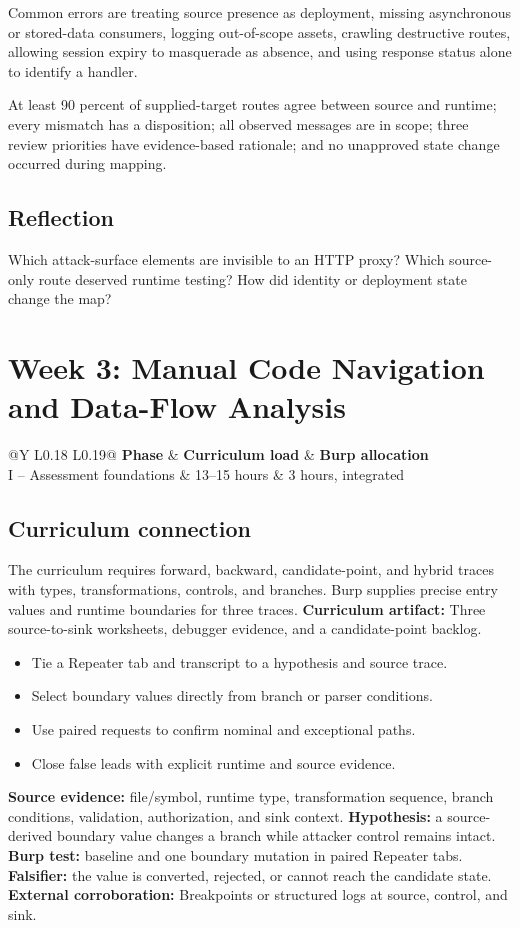 \documentclass[11pt]{article}
\makeatletter
\newcommand{\weekheader}[5]{%
  \clearpage
  \section{Week #1: #2}
  \begin{tcolorbox}[colback=Navy,colframe=Navy,coltext=white]
    \begin{tabularx}{\linewidth}{@{}Y L{0.18\linewidth} L{0.19\linewidth}@{}}
      \textbf{Phase} & \textbf{Curriculum load} & \textbf{Burp allocation}\\
      #3 & #4 hours & #5 hours, integrated
    \end{tabularx}
  \end{tcolorbox}
}
\newcommand{\weekfield}[2]{%
  \Needspace{5\baselineskip}
  \subsection*{#1}
  #2
}
\newcommand{\curriculumartifact}[1]{\textbf{Curriculum artifact:} #1}
\newcommand{\externalproof}[1]{\textbf{External corroboration:} #1}
\makeatother
\begin{document}
\begin{troubleshootingbox}
Common errors are treating source presence as deployment, missing asynchronous
or stored-data consumers, logging out-of-scope assets, crawling destructive
routes, allowing session expiry to masquerade as absence, and using response
status alone to identify a handler.
\end{troubleshootingbox}

\begin{checkpoints}
At least 90 percent of supplied-target routes agree between source and runtime;
every mismatch has a disposition; all observed messages are in scope; three
review priorities have evidence-based rationale; and no unapproved state change
occurred during mapping.
\end{checkpoints}

\weekfield{Reflection}{Which attack-surface elements are invisible to an HTTP
proxy? Which source-only route deserved runtime testing? How did identity or
deployment state change the map?}

\weekheader{3}{Manual Code Navigation and Data-Flow Analysis}{I -- Assessment foundations}{13--15}{3}

\weekfield{Curriculum connection}{The curriculum requires forward, backward,
candidate-point, and hybrid traces with types, transformations, controls, and
branches. Burp supplies precise entry values and runtime boundaries for three
traces. \curriculumartifact{Three source-to-sink worksheets, debugger evidence,
and a candidate-point backlog.}}

\begin{objectivebox}
\begin{itemize}
  \item Tie a Repeater tab and transcript to a hypothesis and source trace.
  \item Select boundary values directly from branch or parser conditions.
  \item Use paired requests to confirm nominal and exceptional paths.
  \item Close false leads with explicit runtime and source evidence.
\end{itemize}
\end{objectivebox}

\begin{bridgebox}
\textbf{Source evidence:} file/symbol, runtime type, transformation sequence,
branch conditions, validation, authorization, and sink context. \textbf{Hypothesis:}
a source-derived boundary value changes a branch while attacker control remains
intact. \textbf{Burp test:} baseline and one boundary mutation in paired Repeater
tabs. \textbf{Falsifier:} the value is converted, rejected, or cannot reach the
candidate state. \externalproof{Breakpoints or structured logs at source,
control, and sink.}
\end{bridgebox}
\end{document}

